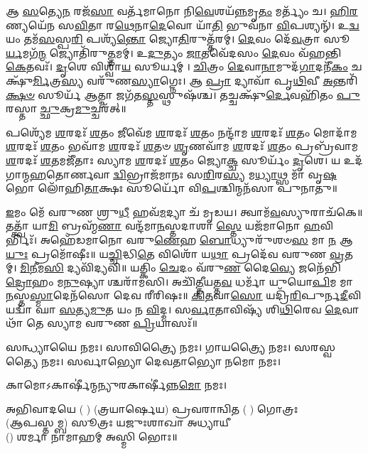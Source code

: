 𑌆 \ul{𑌸}\-𑌤𑍍𑌯𑍇\-\ul{𑌨} 𑌰𑌜᳴\-\ul{𑌸𑌾} 𑌵𑌰𑍍𑌤᳴𑌮𑌾𑌨𑍋 𑌨𑌿\-\ul{𑌵𑍇}\-𑌶𑌯᳴\-\ul{𑌨𑍍𑌨}\-𑌮𑍃\-\ul{𑌤𑌂} 𑌮𑌰𑍍𑌤𑍍𑌯𑌂᳴ 𑌚। \ul{𑌹𑌿}\-\-\ul{𑌰}\-𑌣𑍍𑌯𑌯𑍇᳴𑌨 𑌸\-\ul{𑌵𑌿}\-𑌤𑌾 𑌰\-\ul{𑌥𑍇}\-𑌨𑌾\-\ul{𑌦𑍇}\-𑌵𑍋 𑌯𑌾᳴\-\ul{𑌤𑌿} 𑌭𑍁𑌵᳴𑌨𑌾 \ul{𑌵𑌿}\-𑌪𑌶𑍍𑌯𑌨𑍍᳴। 𑌉\-\ul{𑌦𑍍𑌵}\-𑌯𑌂 𑌤𑌮᳴\-\ul{𑌸}\-𑌸𑍍𑌪\-\ul{𑌰𑌿} 𑌪𑌶𑍍𑌯᳴\-\ul{𑌨𑍍𑌤𑍋} 𑌜𑍍𑌯𑍋\-\ul{𑌤𑌿}\-𑌰𑍁𑌤𑍍𑌤᳴𑌰𑌮𑍍। \ul{𑌦𑍇}\-𑌵𑌂 𑌦𑍇᳴\-\ul{𑌵}\-𑌤𑍍𑌰𑌾 𑌸𑍂\-\ul{𑌰𑍍𑌯}\-𑌮𑌗᳴\-\ul{𑌨𑍍𑌮} 𑌜𑍍𑌯𑍋𑌤𑌿᳴𑌰𑍁\-\ul{𑌤𑍍𑌤}\-𑌮𑌮𑍍। 𑌉\-\ul{𑌦𑍁}\-𑌤𑍍𑌯𑌂 \ul{𑌜𑌾}\-𑌤𑌵𑍇᳴𑌦𑌸𑌂 \ul{𑌦𑍇}\-𑌵𑌂 𑌵᳴𑌹𑌨𑍍𑌤𑌿 \ul{𑌕𑍇}\-𑌤𑌵𑌃᳴। \ul{𑌦𑍃}\-𑌶𑍇 𑌵𑌿𑌶𑍍𑌵𑌾᳴\-\ul{𑌯} 𑌸𑍂𑌰𑍍𑌯𑌮𑍍। \ul{𑌚𑌿}\-𑌤𑍍𑌰𑌂 \ul{𑌦𑍇}\-𑌵𑌾\-\ul{𑌨𑌾}\-𑌮𑍁𑌦᳴\-\ul{𑌗𑌾}\-𑌦𑌨𑍀᳴\-\ul{𑌕𑌂} 𑌚𑌕𑍍𑌷𑍁᳴\-\ul{𑌰𑍍𑌮𑌿}\-𑌤𑍍𑌰\-\ul{𑌸𑍍𑌯} 𑌵𑌰𑍁᳴𑌣\-\ul{𑌸𑍍𑌯𑌾}\-𑌗𑍍𑌨𑍇𑌃। 𑌆 \ul{𑌪𑍍𑌰𑌾} 𑌦𑍍𑌯𑌾𑌵𑌾᳴ 𑌪𑍃\-\ul{𑌥𑌿}\-𑌵𑍀 \ul{𑌅}\-𑌨𑍍𑌤𑌰𑌿᳴\-\ul{𑌕𑍍𑌷}\-\-\ul{𑍞} 𑌸𑍂𑌰𑍍𑌯᳴ \ul{𑌆}\-𑌤𑍍𑌮𑌾 𑌜𑌗᳴𑌤\-\ul{𑌸𑍍𑌤}\-𑌸𑍍𑌥𑍁𑌷᳴𑌶𑍍𑌚। 𑌤𑌚𑍍𑌚𑌕𑍍𑌷𑍁᳴\-\ul{𑌰𑍍𑌦𑍇}\-𑌵𑌹𑌿᳴𑌤𑌂 \ul{𑌪𑍁}\-𑌰𑌸𑍍𑌤𑌾\-\ul{𑌚𑍍𑌛𑍁}\-𑌕𑍍𑌰\-\ul{𑌮𑍁}\-𑌚𑍍𑌚𑌰᳴𑌤𑍍॥

𑌪𑌶𑍍𑌯𑍇᳴𑌮 \ul{𑌶}\-𑌰𑌦𑌃᳴ \ul{𑌶}\-𑌤𑌂 𑌜𑍀𑌵𑍇᳴𑌮 \ul{𑌶}\-𑌰𑌦𑌃᳴ \ul{𑌶}\-𑌤𑌂 𑌨𑌨𑍍𑌦𑌾᳴𑌮 \ul{𑌶}\-𑌰𑌦𑌃᳴ \ul{𑌶}\-𑌤𑌂 𑌮𑍋𑌦𑌾᳴𑌮 \ul{𑌶}\-𑌰𑌦𑌃᳴ \ul{𑌶}\-𑌤𑌂 𑌭𑌵𑌾᳴𑌮 \ul{𑌶}\-𑌰𑌦𑌃᳴ \ul{𑌶}\-𑌤𑍞 \ul{𑌶𑍃}\-𑌣𑌵𑌾᳴𑌮 \ul{𑌶}\-𑌰𑌦𑌃᳴ \ul{𑌶}\-𑌤𑌂 𑌪𑍍𑌰𑌬𑍍𑌰᳴𑌵𑌾𑌮 \ul{𑌶}\-𑌰𑌦𑌃᳴ \ul{𑌶}\-𑌤𑌮𑌜𑍀᳴𑌤𑌾𑌃 𑌸𑍍𑌯𑌾𑌮 \ul{𑌶}\-𑌰𑌦𑌃᳴ \ul{𑌶}\-𑌤𑌂 𑌜𑍍𑌯𑍋\-\ul{𑌕𑍍𑌚} 𑌸𑍂𑌰𑍍𑌯𑌂᳴ \ul{𑌦𑍃}\-𑌶𑍇। 𑌯 𑌉𑌦᳴𑌗𑌾𑌨𑍍𑌮\-\ul{𑌹}\-𑌤𑍋𑌰𑍍𑌣𑌵𑌾\-\ul{𑌦𑍍𑌵𑌿}\-𑌭𑍍𑌰𑌾𑌜᳴𑌮𑌾𑌨𑌃 𑌸\-\ul{𑌰𑌿}\-𑌰\-\ul{𑌸𑍍𑌯} 𑌮\-\ul{𑌧𑍍𑌯𑌾}\-𑌥𑍍𑌸 𑌮𑌾᳴ 𑌵𑍃\-\ul{𑌷}\-𑌭𑍋 𑌲𑍋᳴𑌹𑌿\-\ul{𑌤𑌾}\-𑌕𑍍𑌷𑌃 𑌸𑍂𑌰𑍍𑌯𑍋᳴ 𑌵𑌿\-\ul{𑌪}\-𑌶𑍍𑌚𑌿𑌨𑍍𑌮𑌨᳴𑌸𑌾 𑌪𑍁𑌨𑌾𑌤𑍁॥

\-\ul{𑌇}\-𑌮𑌂 𑌮𑍇᳴ 𑌵𑌰𑍁𑌣 𑌶𑍍𑌰𑍁\-\ul{𑌧𑍀} 𑌹𑌵᳴\-\ul{𑌮}\-𑌦𑍍𑌯𑌾 𑌚᳴ 𑌮𑍃𑌡𑌯। 𑌤𑍍𑌵𑌾𑌮᳴\-\ul{𑌵}\-𑌸𑍍𑌯𑍁𑌰𑌾𑌚᳴𑌕𑍇॥ 𑌤𑌤𑍍𑌤𑍍𑌵𑌾᳴ 𑌯𑌾\-\ul{𑌮𑌿} 𑌬𑍍𑌰𑌹𑍍𑌮᳴\-\ul{𑌣𑌾} 𑌵𑌨𑍍𑌦᳴𑌮𑌾\-\ul{𑌨}\-𑌸𑍍𑌤𑌦𑌾𑌶𑌾\-\ul{𑌸𑍍𑌤𑍇} 𑌯𑌜᳴𑌮𑌾𑌨𑍋 \ul{𑌹}\-𑌵𑌿𑌰𑍍𑌭𑌿𑌃᳴। 𑌅𑌹𑍇᳴𑌡𑌮𑌾𑌨𑍋 𑌵𑌰𑍁\-\ul{𑌣𑍇}\-𑌹 \ul{𑌬𑍋}\-𑌧𑍍𑌯𑍁𑌰𑍁᳴𑌶𑍞\-\ul{𑌸} 𑌮𑌾 \ul{𑌨} 𑌆\-\ul{𑌯𑍁𑌃} 𑌪𑍍𑌰𑌮𑍋᳴𑌷𑍀𑌃॥
𑌯\-\ul{𑌚𑍍𑌚𑌿}\-𑌦𑍍𑌧𑌿\-\ul{𑌤𑍇} 𑌵𑌿𑌶𑍋᳴ 𑌯\-\ul{𑌥𑌾} 𑌪𑍍𑌰𑌦𑍇᳴𑌵 𑌵𑌰𑍁𑌣 \ul{𑌵𑍍𑌰}\-𑌤𑌮𑍍। \ul{𑌮𑌿}\-\-\ul{𑌨𑍀}\-𑌮\-\ul{𑌸𑌿} 𑌦𑍍𑌯𑌵𑌿᳴𑌦𑍍𑌯𑌵𑌿॥ 𑌯𑌤𑍍𑌕𑌿𑌂 \ul{𑌚𑍇}\-𑌦𑌂 𑌵᳴𑌰𑍁\-\ul{𑌣} 𑌦𑍈\-\ul{𑌵𑍍𑌯𑍇} 𑌜𑌨𑍇᳴𑌭𑌿\-\ul{𑌦𑍍𑌰𑍋}\-𑌹𑌂 𑌮\-\ul{𑌨𑍁}\-𑌷𑍍𑌯𑌾𑌶𑍍𑌚𑌰𑌾᳴𑌮𑌸𑌿। 𑌅𑌚𑌿᳴\-\ul{𑌤𑍍𑌤𑍀}\-𑌯𑌤𑍍𑌤\-\ul{𑌵} 𑌧𑌰𑍍𑌮𑌾᳴ 𑌯𑍁𑌯𑍋\-\ul{𑌪𑌿}\-𑌮 𑌮𑌾 \ul{𑌨}\-𑌸𑍍𑌤\-\ul{𑌸𑍍𑌮𑌾}\-𑌦𑍇𑌨᳴𑌸𑍋 𑌦𑍇𑌵 𑌰𑍀𑌰𑌿𑌷𑌃॥ \ul{𑌕𑌿}\-\-\ul{𑌤}\-𑌵𑌾\-\ul{𑌸𑍋} 𑌯𑌦𑍍𑌰𑌿᳴\-\ul{𑌰𑌿}\-𑌪𑍁𑌰𑍍𑌨\-\ul{𑌦𑍀}\-𑌵𑌿 𑌯𑌦𑍍𑌵𑌾᳴ 𑌘𑌾 \ul{𑌸}\-𑌤𑍍𑌯\-\ul{𑌮𑍁}\-𑌤 𑌯𑌂 𑌨 \ul{𑌵𑌿}\-𑌦𑍍𑌮। 𑌸\-\ul{𑌰𑍍𑌵𑌾}\-𑌤𑌾𑌵𑌿𑌷𑍍𑌯᳴ 𑌶𑌿\-\ul{𑌥𑌿}\-𑌰𑍇𑌵 \ul{𑌦𑍇}\-𑌵𑌾𑌥𑌾᳴ 𑌤𑍇 𑌸𑍍𑌯𑌾𑌮 𑌵𑌰𑍁𑌣 \ul{𑌪𑍍𑌰𑌿}\-𑌯𑌾𑌸𑌃᳴॥


𑌸𑌨𑍍𑌧𑍍𑌯𑌾𑌯𑍈 𑌨𑌮𑌃।  
𑌸𑌾𑌵𑌿𑌤𑍍𑌰𑍍𑌯𑍈 𑌨𑌮𑌃। 
𑌗𑌾𑌯𑌤𑍍𑌰𑍍𑌯𑍈 𑌨𑌮𑌃।  
𑌸𑌰𑌸𑍍𑌵𑌤𑍍𑌯𑍈 𑌨𑌮𑌃।  
𑌸𑌰𑍍𑌵𑌾𑌭𑍍𑌯𑍋 𑌦𑍇𑌵𑌤𑌾𑌭𑍍𑌯𑍋 𑌨𑌮𑍋 𑌨𑌮𑌃। 

𑌕𑌾𑌮𑍋𑌽𑌕𑌾𑌰𑍍\mbox{}𑌷𑍀॑𑌨𑍍𑌮𑌨𑍍𑌯𑍁𑌰𑌕𑌾𑌰𑍍\mbox{}𑌷𑍀॑𑌨𑍍𑌨\-\ul{𑌮𑍋} 𑌨𑌮𑌃।

𑌅𑌭𑌿𑌵𑌾𑌦𑌯𑍇 ( ) (𑌤𑍍𑌰𑌯𑌾𑌰𑍍𑌷𑍇𑌯) 𑌪𑍍𑌰𑌵𑌰𑌾𑌨𑍍𑌵𑌿𑌤 ( ) 𑌗𑍋𑌤𑍍𑌰𑌃\\
(𑌆𑌪𑌸𑍍𑌤𑌮𑍍𑌬) 𑌸𑍂𑌤𑍍𑌰𑌃 𑌯𑌜𑍁𑌃𑌶𑌾𑌖𑌾 𑌅𑌧𑍍𑌯𑌾𑌯𑍀\\
() 𑌶𑌰𑍍𑌮𑌾 𑌨𑌾𑌮𑌾𑌹𑌮𑍍 𑌅𑌸𑍍𑌮𑌿 𑌭𑍋𑌃॥

